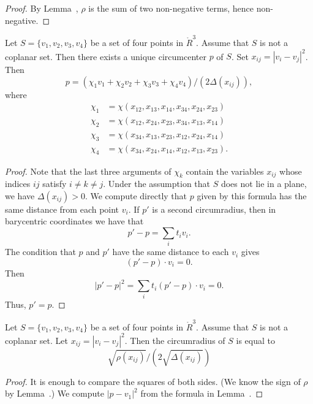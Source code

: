\begin{proof} By Lemma~,
$\rho$ is the sum of two non-negative terms, hence
non-negative.
\end{proof}

\newpage

\begin{lemma}
Let $S=\{v_1,v_2,v_3,v_4\}$ be a set of four points in $\ring{R}^3$.
Assume that $S$ is not a coplanar set.  
Then there exists a unique circumcenter $p$
of $S$.  Set $x_{ij} = |v_i-v_j|^2$.
Then 
    $$
    p = (\chi_1 v_1 + \chi_2 v_2 + \chi_3 v_3 + \chi_4
    v_4)/(2\Delta(x_{ij})),
    $$
where
    $$
    \begin{array}{lll}
    \chi_1 &= \chi(x_{12},x_{13},x_{14},x_{34},x_{24},x_{23})\\
    \chi_2 &= \chi(x_{12},x_{24},x_{23},x_{34},x_{13},x_{14})\\
    \chi_3 &= \chi(x_{34},x_{13},x_{23},x_{12},x_{24},x_{14})\\
    \chi_4 &= \chi(x_{34},x_{24},x_{14},x_{12},x_{13},x_{23}).
    \end{array}
    $$
\end{lemma}


\begin{proof}
Note that the last three arguments of $\chi_k$ 
contain the variables $x_{ij}$ whose
indices $ij$ satisfy $i\ne k\ne j$.
Under the assumption that $S$ does not lie
in a plane, we have $\Delta(x_{ij})>0$. 
We compute directly that $p$ given by this
formula has the same distance from each point
$v_i$.  If $p'$ is a second circumradius, then in 
barycentric coordinates we have that
  $$p'-p = \sum_i t_i v_i.$$
The condition that $p$ and $p'$ have the same distance to each $v_i$
gives
  $$(p'-p)\cdot v_i=0.$$
Then $$|p'-p|^2 = \sum_it_i (p'-p)\cdot v_i = 0.$$  
Thus, $p'=p$.
\end{proof}
\newpage


\begin{lemma}
Let $S=\{v_1,v_2,v_3,v_4\}$ be a set of four points in $\ring{R}^3$.
Assume that $S$ is not a coplanar set.  
Let $x_{ij}=|v_i-v_j|^2$.
Then the circumradius of
	$S$ is equal to 
		$$
		\sqrt{\rho(x_{ij})}/
		(2\sqrt{\Delta(x_{ij})})
		$$
\end{lemma}

\begin{proof} It is enough to compare the
squares of both sides.  (We know the sign of
$\rho$ by Lemma~.)  We
compute $|p-v_1|^2$ from the formula
in Lemma~.
\end{proof}
\newpage


